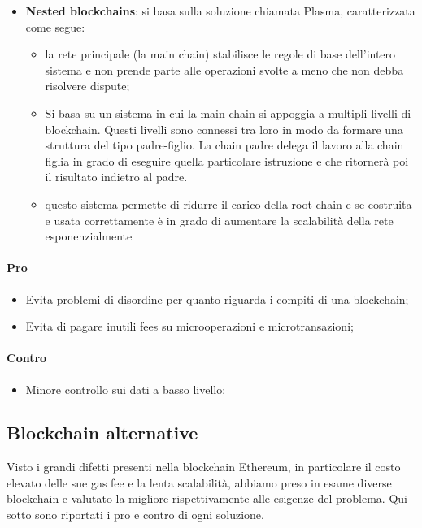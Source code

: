     \begin{itemize}
        \item \textbf{Nested blockchains}: si basa sulla soluzione chiamata Plasma, caratterizzata come segue:
        \begin{itemize}
            \item la rete principale (la main chain) stabilisce le regole di base dell’intero sistema e non prende parte alle operazioni svolte a meno che non debba risolvere dispute;
            \item Si basa su un sistema in cui la main chain si appoggia a multipli livelli di blockchain. Questi livelli sono connessi tra loro in modo da formare una struttura del tipo padre-figlio. 
            La chain padre delega il lavoro alla chain figlia in grado di eseguire quella particolare istruzione e che ritornerà poi il risultato indietro al padre.
            \item questo sistema permette di ridurre il carico della root chain e se costruita e usata correttamente è in grado di aumentare la scalabilità della rete esponenzialmente     
        \end{itemize}
    \end{itemize}
    \paragraph{Pro}
    \begin{itemize}
        \item Evita problemi di disordine per quanto riguarda i compiti di una blockchain;
        \item Evita di pagare inutili fees su microoperazioni e microtransazioni;
    \end{itemize}
    \paragraph{Contro}
    \begin{itemize}
        \item Minore controllo sui dati a basso livello;        
    \end{itemize}

	\subsection{Blockchain alternative}
	Visto i grandi difetti presenti nella blockchain Ethereum\glo, in particolare il costo elevato delle sue gas fee e la lenta scalabilità, abbiamo preso in esame diverse blockchain e valutato la migliore 
	rispettivamente alle esigenze del problema. Qui sotto sono riportati i pro e contro di ogni soluzione.

